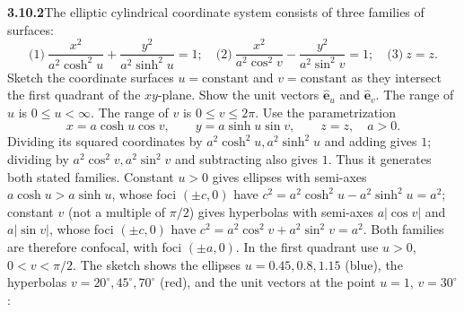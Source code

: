 \par\bigskip
\noindent\textbf{3.10.2}\quad The elliptic cylindrical coordinate system
consists of three families of surfaces:
\[
\text{(1)}\ \frac{x^{2}}{a^{2}\cosh^{2}u}+\frac{y^{2}}{a^{2}\sinh^{2}u}=1;
\quad
\text{(2)}\ \frac{x^{2}}{a^{2}\cos^{2}v}-\frac{y^{2}}{a^{2}\sin^{2}v}=1;
\quad
\text{(3)}\ z=z.
\]
Sketch the coordinate surfaces $u=\text{constant}$ and $v=\text{constant}$ as
they intersect the first quadrant of the $xy$-plane. Show the unit vectors
$\hat{\mathbf{e}}_{u}$ and $\hat{\mathbf{e}}_{v}$. The range of $u$ is
$0\le u<\infty$. The range of $v$ is $0\le v\le2\pi$.
\solution
Use the parametrization
\[
x=a\cosh u\cos v,\qquad y=a\sinh u\sin v,\qquad z=z,\quad a>0.
\]
Dividing its squared coordinates by $a^2\cosh^2u,a^2\sinh^2u$
and adding gives $1$; dividing by $a^2\cos^2v,a^2\sin^2v$
and subtracting also gives $1$. Thus it generates both stated families.
Constant $u>0$ gives ellipses with semi-axes $a\cosh u>a\sinh u$, whose
foci $(\pm c,0)$ have $c^2=a^2\cosh^2u-a^2\sinh^2u=a^2$; constant $v$
(not a multiple of $\pi/2$) gives hyperbolas with semi-axes
$a|\cos v|$ and $a|\sin v|$, whose foci $(\pm c,0)$ have
$c^2=a^2\cos^2v+a^2\sin^2v=a^2$. Both families are therefore confocal,
with foci $(\pm a,0)$. In the first quadrant use
$u>0$, $0<v<\pi/2$. The sketch shows the ellipses $u=0.45,0.8,1.15$
(blue), the hyperbolas $v=20^\circ,45^\circ,70^\circ$ (red), and the
unit vectors at the point $u=1$, $v=30^\circ$:
\begin{center}
\end{center}
